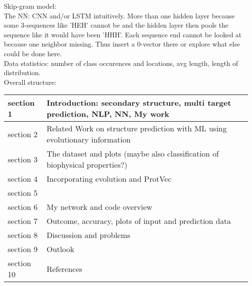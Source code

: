 \documentclass{article}
\begin{document}
Skip-gram model:\\

The NN: CNN and/or LSTM intuitively. More than one hidden layer because some 3-sequences like 'HEH' cannot be and the hidden layer then pools the sequence like it would have been 'HHH'. Each sequence end cannot be looked at because one neighbor missing. Thus insert a 0-vector there or explore what else could be done here.\\

Data statistics: number of class occurences and locations, avg length, length of distribution.\\

Overall structure:\\

\begin{tabular}{| l | p{10cm} |}
\hline
section 1 & Introduction: secondary structure, multi target prediction, NLP, NN, My work\\ \hline
section 2 & Related Work on structure prediction with ML using evolutionary information \\ \hline
section 3 & The dataset and plots (maybe also classification of biophysical properties?)\\ \hline
section 4 & Incorporating evolution and ProtVec\\ \hline
section 5 & \\ \hline
section 6 & My network and code overview\\ \hline
section 7 & Outcome, accuracy, plots of input and prediction data\\ \hline
section 8 &	Discussion and problems\\ \hline
section 9 & Outlook\\ \hline
section 10 & References\\ \hline
\end{tabular}
\end{document}
